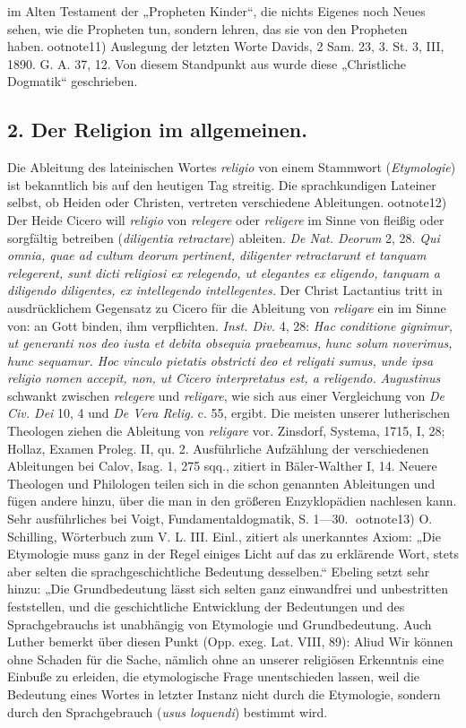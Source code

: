 im Alten Testament der „Propheten Kinder“, die nichts Eigenes noch Neues sehen, wie die Propheten tun, sondern lehren, das sie von den Propheten haben.ootnote{11) Auslegung der letzten Worte Davids, 2 Sam. 23, 3. St. 3, III, 1890. G. A. 37, 12.} Von diesem Standpunkt aus wurde diese „Christliche Dogmatik“ geschrieben.

\subsection*{2. Der Religion im allgemeinen.}

Die Ableitung des lateinischen Wortes \textit{religio} von einem Stammwort (\textit{Etymologie}) ist bekanntlich bis auf den heutigen Tag streitig. Die sprachkundigen Lateiner selbst, ob Heiden oder Christen, vertreten verschiedene Ableitungen.ootnote{12) Der Heide Cicero will \textit{religio} von \textit{relegere} oder \textit{religere} im Sinne von fleißig oder sorgfältig betreiben (\textit{diligentia retractare}) ableiten. \textit{De Nat. Deorum} 2, 28. \textit{Qui omnia, quae ad cultum deorum pertinent, diligenter retractarunt et tanquam relegerent, sunt dicti religiosi ex relegendo, ut elegantes ex eligendo, tanquam a diligendo diligentes, ex intellegendo intellegentes.} Der Christ Lactantius tritt in ausdrücklichem Gegensatz zu Cicero für die Ableitung von \textit{religare} ein im Sinne von: an Gott binden, ihm verpflichten. \textit{Inst. Div.} 4, 28: \textit{Hac conditione gignimur, ut generanti nos deo iusta et debita obsequia praebeamus, hunc solum noverimus, hunc sequamur. Hoc vinculo pietatis obstricti deo et religati sumus, unde ipsa religio nomen accepit, non, ut Cicero interpretatus est, a religendo.} \textit{Augustinus} schwankt zwischen \textit{relegere} und \textit{religare}, wie sich aus einer Vergleichung von \textit{De Civ. Dei} 10, 4 und \textit{De Vera Relig.} c. 55, ergibt. Die meisten unserer lutherischen Theologen ziehen die Ableitung von \textit{religare} vor. Zinsdorf, Systema, 1715, I, 28; Hollaz, Examen Proleg. II, qu. 2. Ausführliche Aufzählung der verschiedenen Ableitungen bei Calov, Isag. 1, 275 sqq., zitiert in Bäler-Walther I, 14. Neuere Theologen und Philologen teilen sich in die schon genannten Ableitungen und fügen andere hinzu, über die man in den größeren Enzyklopädien nachlesen kann. Sehr ausführliches bei Voigt, Fundamentaldogmatik, S. 1—30.
}ootnote{13) O. Schilling, Wörterbuch zum V. L. III. Einl., zitiert als unerkanntes Axiom: „Die Etymologie muss ganz in der Regel einiges Licht auf das zu erklärende Wort, stets aber selten die sprachgeschichtliche Bedeutung desselben.“ Ebeling setzt sehr hinzu: „Die Grundbedeutung lässt sich selten ganz einwandfrei und unbestritten feststellen, und die geschichtliche Entwicklung der Bedeutungen und des Sprachgebrauchs ist unabhängig von Etymologie und Grundbedeutung. Auch Luther bemerkt über diesen Punkt (Opp. exeg. Lat. VIII, 89): Aliud} Wir können ohne Schaden für die Sache, nämlich ohne an unserer religiösen Erkenntnis eine Einbuße zu erleiden, die etymologische Frage unentschieden lassen, weil die Bedeutung eines Wortes in letzter Instanz nicht durch die Etymologie, sondern durch den Sprachgebrauch (\textit{usus loquendi}) bestimmt wird.